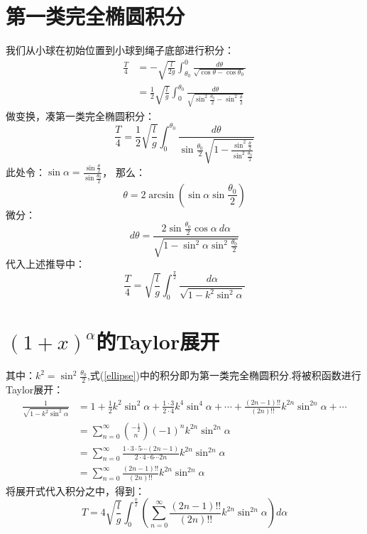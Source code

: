 \documentclass{jams-l}
\theoremstyle{definition}
\theoremstyle{remark}
\numberwithin{equation}{section}
\begin{document}
\section{第一类完全椭圆积分}
我们从小球在初始位置到小球到绳子底部进行积分：
\begin{equation}
\begin{aligned}
    \frac{T}{4}&=-\sqrt{\frac{l}{2g}}\int_{\theta_0}^0 \frac{d\theta}{\sqrt{\cos\theta-\cos\theta_0}}\\
    &=\frac{1}{2}\sqrt{\frac{l}{g}}\int^{\theta_0}_0 \frac{d\theta}{\sqrt{\sin^2\frac{\theta_0}{2}-\sin^2\frac{\theta}{2}}}
    \end{aligned}
\end{equation}
做变换，凑第一类完全椭圆积分：
\begin{equation}
        \frac{T}{4}=\frac{1}{2}\sqrt{\frac{l}{g}}\int^{\theta_0}_0 \frac{d\theta}{\sin\frac{\theta_0}{2}\sqrt{1-\frac{\sin^2\frac{\theta}{2}}{\sin^2\frac{\theta_0}{2}}}}
\end{equation}
此处令：$\sin \alpha=\frac{\sin\frac{\theta}{2}}{\sin\frac{\theta_0}{2}}$，
那么：
\begin{equation}
    \theta=2\arcsin (\sin \alpha \sin \frac{\theta_0}{2})
\end{equation}
微分：
\begin{equation}
    d \theta=\frac{2\sin \frac{\theta_0}{2}\cos \alpha\ d\alpha}{\sqrt{1-\sin^2\alpha \sin^2\frac{\theta_0}{2}}}
\end{equation}
代入上述推导中：
\begin{equation}\label{ellipse}
    \frac{T}{4}=\sqrt{\frac{l}{g}}\int^{\frac{\pi}{2}}_0 \frac{d\alpha}{\sqrt{1-k^2\sin^2\alpha}}
\end{equation}


\section{$(1+x)^{\alpha}$的Taylor展开}
其中：$k^2=\sin^2\frac{\theta_0}{2}$,式(\ref{ellipse})中的积分即为第一类完全椭圆积分.将被积函数进行Taylor展开：
\begin{equation}
\begin{aligned}
    \frac{1}{\sqrt{1-k^2\sin^2\alpha}}&=
    1+\frac{1}{2}k^2\sin^2\alpha+\frac{1\cdot 3}{2\cdot 4}k^4\sin^4\alpha
    +\cdots+\frac{(2n-1)!!}{(2n)!!}k^{2n}\sin ^{2n}\alpha+\cdots\\
    &=\sum_{n=0}^{ \infty} {-\frac{1}{2} \choose n} (-1)^n k^{2n}\sin^{2n} \alpha\\
    &=\sum_{n=0}^{ \infty}\frac{1 \cdot 3 \cdot 5 \cdots (2n-1)}{2 \cdot 4 \cdot 6 \cdots 2n}k^{2n} \sin^{2n} \alpha\\
    &=\sum_{n=0}^{\infty}\frac{(2n-1)!!}{(2n)!!}k^{2n}\sin^{2n} \alpha
\end{aligned}
\end{equation}
将展开式代入积分之中，得到：
\begin{equation}
    T=4\sqrt{\frac{l}{g}}\int_0^{\frac{\pi}{2}} \left(\sum_{n=0}^{\infty}\frac{(2n-1)!!}{(2n)!!}k^{2n}\sin^{2n} \alpha\right) d\alpha
\end{equation}
\end{document}
